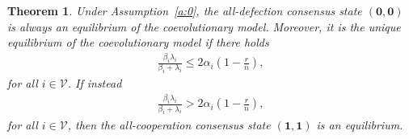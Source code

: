 \documentclass[letterpaper, 10 pt, conference]{ieeeconf}  %
\newcommand{\vect}[1]{\boldsymbol{#1}}
\newtheorem{theorem}{Theorem}
\renewcommand{\eqref}[1]{Eq.~(\ref{#1})}  %
\begin{document}
\begin{theorem}\label{theorem:equilibria}
    Under Assumption~\ref{a:0}, the all-defection consensus state $(\vect{0},\vect{0})$ is always an equilibrium of the coevolutionary model. Moreover, it is the unique equilibrium of the coevolutionary model if there holds
    \begin{align}\label{eq:all_D_unique}
        \frac{\beta_i\lambda_i}{\beta_i+\lambda_i} \leq 2\alpha_i\left(1-\frac{r}{n}\right),
    \end{align}
    for all $i\in\mathcal V$. If instead
       \begin{align}\label{eq:all_coop}
        \frac{\beta_i\lambda_i}{\beta_i+\lambda_i} > 2\alpha_i\left(1-\frac{r}{n}\right),
    \end{align}
    for all $i\in\mathcal V$, then the all-cooperation consensus state $(\vect{1},\vect{1})$ is an equilibrium.
\end{theorem}
\end{document}
